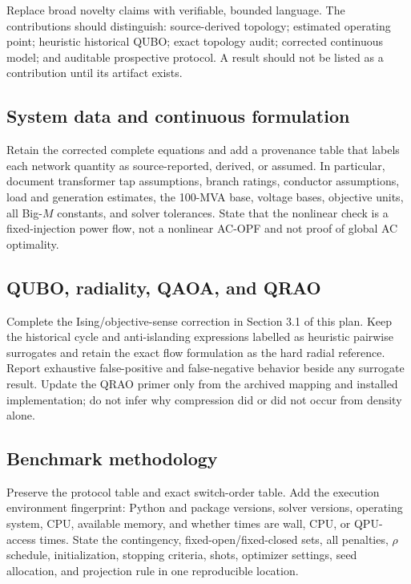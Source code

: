 \documentclass[11pt]{article}
\begin{document}
Replace broad novelty claims with verifiable, bounded language.  The
contributions should distinguish: source-derived topology; estimated
operating point; heuristic historical QUBO; exact topology audit; corrected
continuous model; and auditable prospective protocol.  A result should not be
listed as a contribution until its artifact exists.

\subsection*{System data and continuous formulation}

Retain the corrected complete equations and add a provenance table that labels
each network quantity as source-reported, derived, or assumed.  In particular,
document transformer tap assumptions, branch ratings, conductor assumptions,
load and generation estimates, the 100-MVA base, voltage bases, objective
units, all Big-$M$ constants, and solver tolerances.  State that the nonlinear
check is a fixed-injection power flow, not a nonlinear AC-OPF and not proof of
global AC optimality.

\subsection*{QUBO, radiality, QAOA, and QRAO}

Complete the Ising/objective-sense correction in Section 3.1 of this plan.
Keep the historical cycle and anti-islanding expressions labelled as
heuristic pairwise surrogates and retain the exact flow formulation as the
hard radial reference.  Report exhaustive false-positive and false-negative
behavior beside any surrogate result.  Update the QRAO primer only from the
archived mapping and installed implementation; do not infer why compression
did or did not occur from density alone.

\subsection*{Benchmark methodology}

Preserve the protocol table and exact switch-order table.  Add the execution
environment fingerprint: Python and package versions, solver versions,
operating system, CPU, available memory, and whether times are wall, CPU, or
QPU-access times.  State the contingency, fixed-open/fixed-closed sets, all
penalties, $\rho$ schedule, initialization, stopping criteria, shots,
optimizer settings, seed allocation, and projection rule in one reproducible
location.
\end{document}
